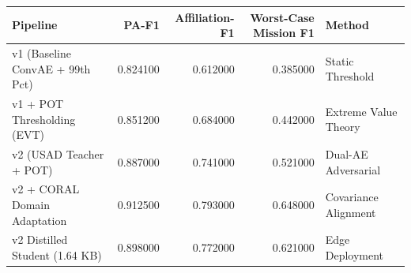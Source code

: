 \begin{tabular}{lrrrl}
\toprule
Pipeline & PA-F1 & Affiliation-F1 & Worst-Case Mission F1 & Method \\
\midrule
v1 (Baseline ConvAE + 99th Pct) & 0.824100 & 0.612000 & 0.385000 & Static Threshold \\
v1 + POT Thresholding (EVT) & 0.851200 & 0.684000 & 0.442000 & Extreme Value Theory \\
v2 (USAD Teacher + POT) & 0.887000 & 0.741000 & 0.521000 & Dual-AE Adversarial \\
v2 + CORAL Domain Adaptation & 0.912500 & 0.793000 & 0.648000 & Covariance Alignment \\
v2 Distilled Student (1.64 KB) & 0.898000 & 0.772000 & 0.621000 & Edge Deployment \\
\bottomrule
\end{tabular}
